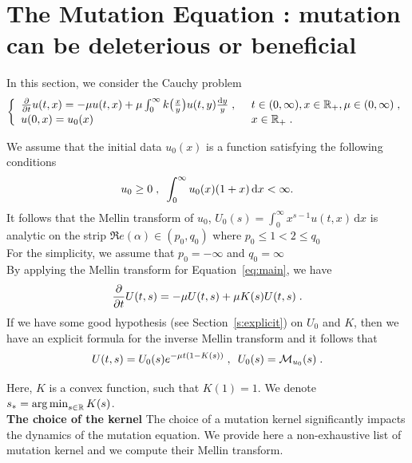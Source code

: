 \documentclass[11pt]{amsart}
\renewcommand{\Re}{\mathfrak{R}e}
\newcommand{\diff}{\,\mathrm{d}}
\begin{document}
\section{The Mutation Equation : mutation can be deleterious or beneficial}

In this section, we consider the Cauchy problem
\begin{equation}\left\{
    \begin{array}{ll}
	\frac{\partial}{\partial t}u(t,x) = - \mu u(t,x) + \mu \int_{0}^{\infty} k\big( \frac{x}{y}\big)u(t,y) \frac{\mathrm dy}{y}
	\; , \enspace
	& t \in (0, \infty), x \in \mathbb{R}_+, \mu \in (0, \infty) \; ,
	\\
	u(0, x) = u_0(x)
	& x \in \mathbb{R}_+
	\; .
    \end{array}
	\right.
    \label{eq:main}
\end{equation}

We assume that the initial data $u_0(x)$ is a function satisfying the following conditions 
$$ u_0 \geq 0 \eqsepv \int_0^\infty u_0(x)(1+x)\diff x < \infty.$$
It follows that the Mellin transform of $u_0$, $U_0(s)= \int_0^\infty x^{s-1}u(t,x)\diff x$ is analytic on the strip $\Re(\alpha) \in (p_0,q_0)$ where $p_0 \leq 1 < 2 \leq q_0$ \\
For the simplicity, we assume that 
$ p_0=-\infty$ and $q_0 = \infty$\\

By applying the Mellin transform for Equation~\eqref{eq:main}, we have
	\begin{equation}
		\frac{\partial}{\partial t} U(t,s) = - \mu U(t,s) + \mu K(s) U(t,s)
		\; .
        \label{eq:explicit_reconstruction}
	\end{equation}
If we have some good hypothesis (see Section~\ref{s:explicit}) on $U_0$ and $K$, then we have an explicit formula for the inverse Mellin transform and it follows that
    \begin{equation*}
        U(t,s) = U_0(s) e^{-\mu t(1 - K(s) ) }
        \; , \enspace
        U_0(s) = \mathcal{M}_{u_0}(s)
        \; .
    \end{equation*}

Here, $K$ is a convex function, such that $K(1) = 1$. We denote $s_* = \mathop{\arg\min}_{s\in \mathbb{R}} K(s)$. \\

\textbf{The choice of the kernel}
The choice of a mutation kernel significantly impacts the dynamics of the mutation equation. We provide here a non-exhaustive list of mutation kernel and we compute their Mellin transform. \\
\end{document}
